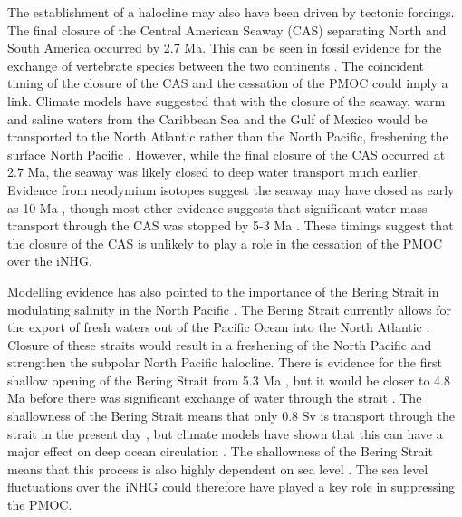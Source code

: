 The establishment of a halocline may also have been driven by tectonic forcings. The final closure of the Central American Seaway (CAS) separating North and South America occurred by 2.7 Ma. This can be seen in fossil evidence for the exchange of vertebrate species between the two continents \citep{molnarClosingCentralAmerican2008}. The coincident timing of the closure of the CAS and the cessation of the PMOC could imply a link. Climate models have suggested that with the closure of the seaway, warm and saline waters from the Caribbean Sea and the Gulf of Mexico would be transported to the North Atlantic rather than the North Pacific, freshening the surface North Pacific \citep{brierleyComparingImpactsMiocene2016}. However, while the final closure of the CAS occurred at 2.7 Ma, the seaway was likely closed to deep water transport much earlier. Evidence from neodymium isotopes suggest the seaway may have closed as early as 10 Ma \citep{sepulchreConsequencesShoalingCentral2014}, though most other evidence suggests that significant water mass transport through the CAS was stopped by 5-3 Ma \citep{molnarClosingCentralAmerican2008}. These timings suggest that the closure of the CAS is unlikely to play a role in the cessation of the PMOC over the iNHG.

Modelling evidence has also pointed to the importance of the Bering Strait in modulating salinity in the North Pacific \citep{huPacificAtlanticSeesawBering2012, otto-bliesnerAmplifiedNorthAtlantic2017}. The Bering Strait currently allows for the export of fresh waters out of the Pacific Ocean into the North Atlantic \citep{huBeringStraitThroughflow2005}. Closure of these straits would result in a freshening of the North Pacific and strengthen the subpolar North Pacific halocline. There is evidence for the first shallow opening of the Bering Strait from 5.3 Ma \citep{gladenkovRefinedAgeEarliest2002}, but it would be closer to 4.8 Ma before there was significant exchange of water through the strait \citep{marincovichEvidenceEarlyOpening1999}. The shallowness of the Bering Strait means that only 0.8 Sv is transport through the strait in the present day \citep{huRoleBeringStrait2012}, but climate models have shown that this can have a major effect on deep ocean circulation \citep{brierleyComparingImpactsMiocene2016, otto-bliesnerAmplifiedNorthAtlantic2017}. The shallowness of the Bering Strait means that this process is also highly dependent on sea level \citep{huInfluenceBeringStrait2010}. The sea level fluctuations over the iNHG could therefore have played a key role in suppressing the PMOC.

